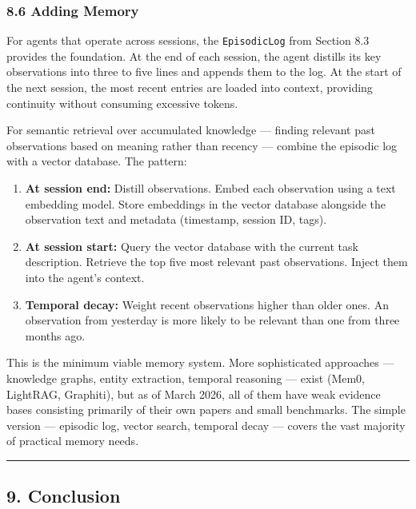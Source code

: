 \documentclass[11pt, a4paper]{article}
\providecommand{\tightlist}{%
  \setlength{\itemsep}{0pt}\setlength{\parskip}{0pt}}
\newcommand{\passthrough}[1]{#1}
\begin{document}
\hypertarget{adding-memory}{%
\subsubsection{8.6 Adding Memory}\label{adding-memory}}

For agents that operate across sessions, the
\passthrough{\lstinline!EpisodicLog!} from Section 8.3 provides the
foundation. At the end of each session, the agent distills its key
observations into three to five lines and appends them to the log. At
the start of the next session, the most recent entries are loaded into
context, providing continuity without consuming excessive tokens.

For semantic retrieval over accumulated knowledge --- finding relevant
past observations based on meaning rather than recency --- combine the
episodic log with a vector database. The pattern:

\begin{enumerate}
\def\labelenumi{\arabic{enumi}.}
\tightlist
\item
  \textbf{At session end:} Distill observations. Embed each observation
  using a text embedding model. Store embeddings in the vector database
  alongside the observation text and metadata (timestamp, session ID,
  tags).
\item
  \textbf{At session start:} Query the vector database with the current
  task description. Retrieve the top five most relevant past
  observations. Inject them into the agent's context.
\item
  \textbf{Temporal decay:} Weight recent observations higher than older
  ones. An observation from yesterday is more likely to be relevant than
  one from three months ago.
\end{enumerate}

This is the minimum viable memory system. More sophisticated approaches
--- knowledge graphs, entity extraction, temporal reasoning --- exist
(Mem0, LightRAG, Graphiti), but as of March 2026, all of them have weak
evidence bases consisting primarily of their own papers and small
benchmarks. The simple version --- episodic log, vector search, temporal
decay --- covers the vast majority of practical memory needs.

\begin{center}\rule{0.5\linewidth}{0.5pt}\end{center}

\hypertarget{conclusion}{%
\subsection{9. Conclusion}\label{conclusion}}
\end{document}
